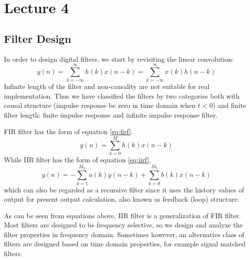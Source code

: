 \chapter*{Lecture 4}

\section*{Filter Design}

In order to design digital filters, we start by revisiting the linear convolution:
\begin{equation}
  \label{eq:firconv}
  y(n) = \sum_{k=-\infty}^{\infty}h(k)x(n-k)=\sum_{k=-\infty}^{\infty}x(k)h(n-k)
\end{equation}
Infinite length of the filter and non-causality are not suitable for real implementation.
Thus we have classified the filters by two categories both with causal structure 
(impulse response be zero in time domain when $t<0$) and finite filter length:
finite impulse response and infinite impulse response filter. 

FIR filter has the form of equation \ref{eq:firf}.
\begin{equation}
  \label{eq:firf}
  y(n) = \sum_{k=0}^{M}h(k)x(n-k)
\end{equation}
While IIR filter has the form of equation \ref{eq:iirf},
\begin{equation}
  \label{eq:iirf}
  y(n)=-\sum_{k=1}^{M_a}a(k)y(n-k) + \sum_{k=0}^{M_b}b(k)x(n-k)
\end{equation}
which can also be regarded as a recursive filter since it uses the history values 
of output for present output calculation, also known as feedback (loop) structure.  

As can be seen from equations above, IIR filter is a generalization of FIR filter. 
Most filters are designed to be frequency selective, so we design and analyze the 
filter properties in frequency domain. Sometimes however, an alternative class of 
filters are designed based on time domain properties, for example signal matched 
filters.

